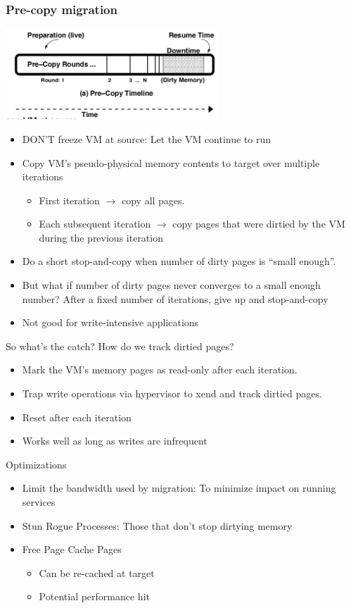 \documentclass[12pt]{article}
\begin{document}
\subsubsection{Pre-copy migration}
\includegraphics[width=0.6\textwidth]{Pre-copyMigration.png}
\begin{itemize}
    \item DON'T freeze VM at source: Let the VM continue to run
    \item Copy VM's pseudo-physical memory contents to target over multiple iterations \begin{itemize}
        \item First iteration $\to$ copy all pages.
        \item Each subsequent iteration $\to$ copy pages that were dirtied by the VM during the previous iteration
    \end{itemize}
    \item Do a short stop-and-copy when number of dirty pages is “small enough”.
    \item But what if number of dirty pages never converges to a small enough number? After a fixed number of iterations, give up and stop-and-copy
    \item Not good for write-intensive applications
\end{itemize}
So what's the catch? How do we track dirtied pages?
\begin{itemize}
    \item Mark the VM's memory pages as read-only after each iteration.
    \item Trap write operations via hypervisor to xend and track dirtied pages.
    \item Reset after each iteration
    \item Works well as long as writes are infrequent
\end{itemize}
Optimizations
\begin{itemize}
    \item Limit the bandwidth used by migration: To minimize impact on running services
    \item Stun Rogue Processes: Those that don't stop dirtying memory
    \item Free Page Cache Pages \begin{itemize}
        \item Can be re-cached at target
        \item Potential performance hit
    \end{itemize}
\end{itemize}
\end{document}
